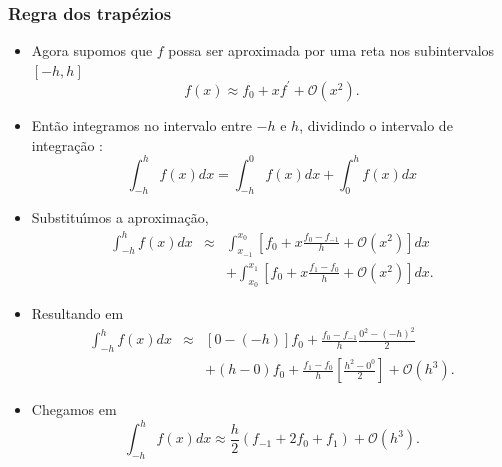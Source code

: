 \documentclass[xcolor=table]{beamer}
\newenvironment{stepitemize}{\begin{itemize}[<+->]}{\end{itemize} }
\begin{document}
\begin{frame}%

\frametitle{Regra dos trap\'{e}zios}

\begin{stepitemize}
\item Agora supomos que $f$ possa ser aproximada por uma reta nos
subintervalos $[-h,h]$%
\[
f\left( x\right) \approx f_{0}+xf^{\prime }+\mathcal{O}\left( x^{2}\right) . 
\]

\item Ent\~{a}o integramos no intervalo entre $-h$ e $h$, dividindo o
intervalo de integra\c{c}\~{a}o :%
\[
\int_{-h}^{h}f\left( x\right) dx=\int_{-h}^{0}f\left( x\right)
dx+\int_{0}^{h}f\left( x\right) dx 
\]

\item Substitu\'{\i}mos a aproxima\c{c}\~{a}o,%
\begin{eqnarray*}
\int_{-h}^{h}f\left( x\right) dx &\approx &\int_{x_{-1}}^{x_{0}}\left[
f_{0}+x\frac{f_{0}-f_{-1}}{h}+\mathcal{O}\left( x^{2}\right) \right] dx \\
&&+\int_{x_{0}}^{x_{1}}\left[ f_{0}+x\frac{f_{1}-f_{0}}{h}+\mathcal{O}\left(
x^{2}\right) \right] dx.
\end{eqnarray*}
\end{stepitemize}

\transboxout%
\end{frame}%

\begin{frame}%

\begin{stepitemize}
\item Resultando em%
\begin{eqnarray*}
\int_{-h}^{h}f\left( x\right) dx &\approx &\left[ 0-\left( -h\right) \right]
f_{0}+\frac{f_{0}-f_{-1}}{h}\frac{0^{2}-\left( -h\right) ^{2}}{2} \\
&&+\left( h-0\right) f_{0}+\frac{f_{1}-f_{0}}{h}\left[ \frac{h^{2}-0^{0}}{2}%
\right] +\mathcal{O}\left( h^{3}\right) .
\end{eqnarray*}

\item Chegamos em%
\begin{equation}
\int_{-h}^{h}f\left( x\right) dx\approx \frac{h}{2}\left(
f_{-1}+2f_{0}+f_{1}\right) +\mathcal{O}\left( h^{3}\right) .  \label{eq.trapezio}
\end{equation}
\end{stepitemize}

\transboxout%
\end{frame}%
\end{document}
